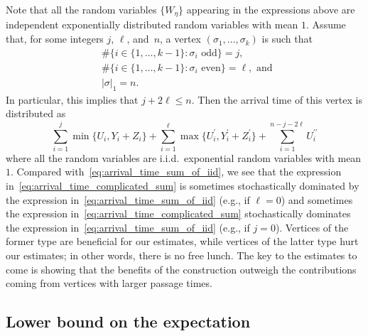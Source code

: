 \documentclass[11pt]{article}
\numberwithin{equation}{section}
\theoremstyle{definition}
\begin{document}
Note that all the random variables $\{W_{\eta}\}$ appearing in the expressions above are independent exponentially distributed random variables with mean $1$. 
Assume that, for some integers $j$, $\ell$, and~$n$, a vertex $(\sigma_1,\ldots,\sigma_k)$ is such that
\begin{align*}
    &\#\{i\in \{1,\ldots,k-1\} : \sigma_i \text{ odd} \} = j, \\
    &\#\{i\in \{1,\ldots,k-1\} : \sigma_i \text{ even} \} = \ell, \text{ and } \\ 
    &|\sigma|_1 = n.
\end{align*}
In particular, this implies that $j+2\ell \leq n$. Then the arrival time of this vertex is distributed as 
\begin{equation}\label{eq:arrival_time_complicated_sum}
    \sum_{i=1}^{j} \min\{U_i,Y_i+Z_i\} + \sum_{i=1}^{\ell} \max\{U_i^\prime,Y_i^\prime+Z_i^\prime\} + 
    \sum_{i=1}^{n-j-2\ell} U_i^{\prime \prime}
\end{equation}
where all the random variables are i.i.d.\ exponential random variables with mean $1$. Compared with~\eqref{eq:arrival_time_sum_of_iid}, 
we see that the expression in~\eqref{eq:arrival_time_complicated_sum} 
is sometimes stochastically dominated by the expression in~\eqref{eq:arrival_time_sum_of_iid} (e.g., if $\ell = 0$) 
and sometimes the expression in~\eqref{eq:arrival_time_complicated_sum} stochastically dominates the expression in~\eqref{eq:arrival_time_sum_of_iid} (e.g., if $j = 0$). 
Vertices of the former type are beneficial for our estimates, while vertices of the latter type hurt our estimates; 
in other words, there is no free lunch. 
The key to the estimates to come is showing that the benefits of the construction outweigh the contributions coming from vertices with larger passage times. 


\subsection{Lower bound on the expectation}\label{sec:switching_subtrees_expectation}
\end{document}
